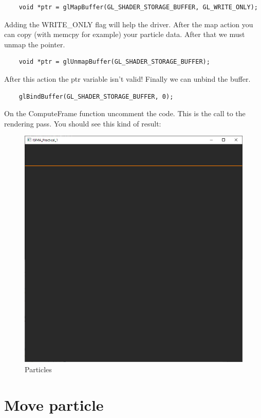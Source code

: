 \documentclass{article}
\begin{document}
\begin{lstlisting}
	void *ptr = glMapBuffer(GL_SHADER_STORAGE_BUFFER, GL_WRITE_ONLY);
\end{lstlisting}
Adding the WRITE\_ONLY flag will help the driver. After the map action you can copy (with memcpy for example) your particle data. After that we must unmap the pointer.
\begin{lstlisting}
	void *ptr = glUnmapBuffer(GL_SHADER_STORAGE_BUFFER);
\end{lstlisting}
After this action the ptr variable isn't valid! Finally we can unbind the buffer.
\begin{lstlisting}
	glBindBuffer(GL_SHADER_STORAGE_BUFFER, 0);
\end{lstlisting}
On the ComputeFrame function uncomment the code. This is the call to the rendering pass. You should see this kind of result:
\begin{figure}[H]
	\centering
	\includegraphics[scale=0.5]{images/init_buffer.png}
	\caption{Particles}
\end{figure}

\section{Move particle}
\end{document}
